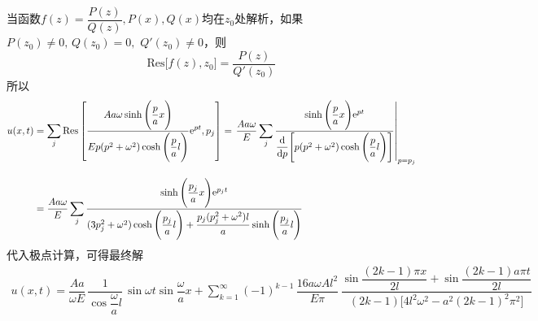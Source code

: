 \begin{enumerate}
\begin{enumerate}[1. ]
		\theorem[一阶极点留数计算定理]
		当函数$\displaystyle f(z) = \dfrac{P(z)}{Q(z)},P(x),Q(x)$均在$z_0$处解析，如果$P(z_0) \neq 0, \, Q(z_0) = 0, \, \, Q'(z_0) \neq 0$，则
		\begin{equation}
			\text{Res}\big[f(z), z_0\big] = \dfrac{P(z)}{Q'(z_0)}
		\end{equation}
		所以
		\begin{align}
			u(x, t) &= \sum_j \text{Res}\left[\dfrac{Aa\omega \sinh \Bigg(\dfrac{p}{a} x\Bigg)}{Ep(p^2 + \omega^2)\cosh \Bigg(\dfrac{p}{a}l\Bigg)}{\rm{e}}^{pt}, p_j\right] = \left. \dfrac{Aa\omega}{E} \sum_j \dfrac{\sinh \Bigg(\dfrac{p}{a} x\Bigg) {\rm{e}}^{pt}}{\dfrac{{\rm{d}} }{{\rm{d}} p} \Bigg[p(p^2 + \omega^2)\cosh \Bigg(\dfrac{p}{a}l\Bigg)\Bigg]}\right|_{p = p_j} \notag \\[1em]
			& = \dfrac{Aa\omega}{E} \sum _j \dfrac{\sinh \Bigg(\dfrac{p_j}{a} x\Bigg) {\rm{e}}^{p_jt}}{(3p_j^2 + \omega^2) \cosh \Bigg(\dfrac{p_j}{a} l\Bigg) + \dfrac{p_j(p_j^2 + \omega^2)l}{a} \sinh \Bigg(\dfrac{p_j}{a} l\Bigg)}
		\end{align}
		代入极点计算，可得最终解
		\begin{align}
			u(x,t) = \dfrac{Aa}{\omega E}\, \dfrac{1}{\cos \dfrac{\omega}{a} l} \,\sin \omega t \sin \dfrac{\omega}{a} x + \sum_{k=1}^{\infty} (-1)^{k-1} \, \dfrac{16a \omega Al^2}{E\pi} \, \dfrac{\sin \dfrac{(2k - 1)\pi x}{2l} + \sin \dfrac{(2k -1)a \pi t}{2l}}{(2k-1)\big[4l^2\omega^2 - a^2(2k-1)^2\pi^2\big]}
		\end{align}
\end{enumerate}
\end{enumerate}





















